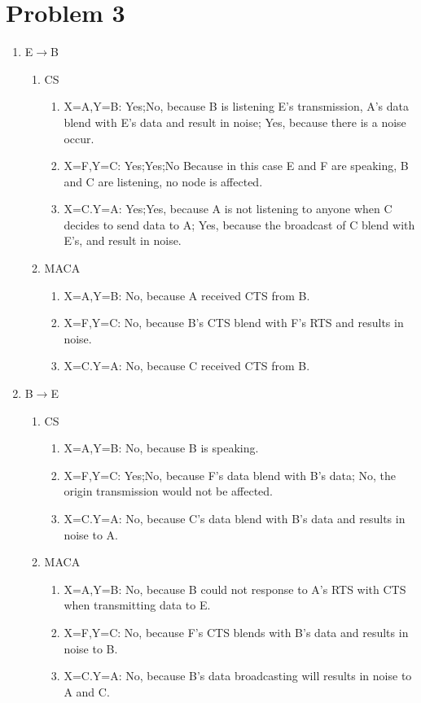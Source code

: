 \documentclass[11pt]{article}
\begin{document}
\section*{Problem 3}
\begin{enumerate}
\item E$\rightarrow$B
\begin{enumerate}
\item CS
\begin{enumerate}
\item X=A,Y=B: Yes;No, because B is listening E's transmission, A's data blend with E's data and result in noise; Yes, because there is a noise occur.
\item X=F,Y=C: Yes;Yes;No Because in this case E and F are speaking, B and C are listening, no node is affected.
\item X=C.Y=A: Yes;Yes, because A is not listening to anyone when C decides to send data to A; Yes, because the broadcast of C blend with E's, and result in noise.
\end{enumerate}
\item MACA
\begin{enumerate}
\item X=A,Y=B: No, because A received CTS from B.
\item X=F,Y=C: No, because B's CTS blend with F's RTS and results in noise.
\item X=C.Y=A: No, because C received CTS from B.
\end{enumerate}
\end{enumerate}
\item B$\rightarrow$E
\begin{enumerate}
\item CS
\begin{enumerate}
\item X=A,Y=B: No, because B is speaking.
\item X=F,Y=C: Yes;No, because F's data blend with B's data; No, the origin transmission would not be affected.
\item X=C.Y=A: No, because C's data blend with B's data and results in noise to A.
\end{enumerate}
\item MACA
\begin{enumerate}
\item X=A,Y=B: No, because B could not response to A's RTS with CTS when transmitting data to E.
\item X=F,Y=C: No, because F's CTS blends with B's data and results in noise to B.
\item X=C.Y=A: No, because B's data broadcasting will results in noise to A and C.

\end{enumerate}
\end{enumerate}
\end{enumerate}
\end{document}
